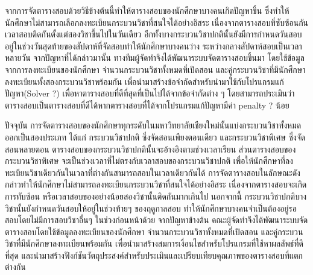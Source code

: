 \maketitle
\makesignature

\ifproject
\begin{abstractTH}
จากการจัดตารางสอบด้วยวิธีข้างต้นนี้ทำให้ตารางสอบของนักศึกษาบางคนเกิดปัญหาขึ้น
ซึ่งทำให้นักศึกษาไม่สามารถเลือกลงทะเบียนกระบวนวิชาที่สนใจได้อย่างอิสระ เนื่องจากตารางสอบที่ซับซ้อนกัน
เวลาสอบติดกันตั้งแต่สองวิชาขึ้นไปในวันเดียว อีกทั้งบางกระบวนวิชาปกตินั้นยังมีการกำหนดวันสอบอยู่ในช่วงวันสุดท้ายของสัปดาห์ที่จัดสอบทำให้นักศึกษาบางคนว่าง
ระหว่างกลางสัปดาห์สอบเป็นเวลาหลายวัน จากปัญหาที่ได้กล่าวมานั้น ทางทีมผู้จัดทำจึงได้พัฒนาระบบจัดตารางสอบขึ้นมา 
โดยใช้ข้อมูลจากการลงทะเบียนของนักศึกษา จำนวนกระบวนวิชาทั้งหมดที่เปิดสอน และคู่กระบวนวิชาที่มีนักศึกษาลงทะเบียนทั้งสองกระบวนวิชาพร้อมกัน 
เพื่อนำมาสร้างข้อจำกัดสำหรับนำมาใช้กับโปรแกรมแก้ปัญหา(Solver ?) เพื่อหาตารางสอบที่ดีที่สุดที่เป็นไปได้จากข้อจำกัดต่าง ๆ 
โดยสามารถประเมินว่าตารางสอบเป็นตารางสอบที่ดีได้หากตารางสอบที่ได้จากโปรแกรมแก้ปัญหามีค่า penalty ? น้อย 

\textcolor{Orange2}{
ปัจจุบัน การจัดตารางสอบของนักศึกษาทุกระดับในมหาวิทยาลัยเชียงใหม่นั้นแบ่งกระบวนวิชาทั้งหมดออกเป็นสองประเภท ได้แก่ กระบวนวิชาปกติ ซึ่งจัดสอนเพียงตอนเดียว และกระบวนวิชาพิเศษ ซึ่งจัดสอนหลายตอน
ตารางสอบของกระบวนวิชาปกตินั้นจะอ้างอิงตามช่วงเวลาเรียน
ส่วนตารางสอบของกระบวนวิชาพิเศษ จะเป็นช่วงเวลาที่ไม่ตรงกับเวลาสอบของกระบวนวิชาปกติ เพื่อให้นักศึกษาที่ลงทะเบียนวิชาเดียวกันในเวลาที่ต่างกันสามารถสอบในเวลาเดียวกันได้
\enskip
การจัดตารางสอบในลักษณะดังกล่าวทำให้นักศึกษาไม่สามารถลงทะเบียนกระบวนวิชาที่สนใจได้อย่างอิสระ เนื่องจากตารางสอบจะเกิดการทับซ้อน หรือเวลาสอบของอย่างน้อยสองวิชานั้นติดกันมากเกินไป
นอกจากนี้ กระบวนวิชาปกติบางวิชานั้นยังกำหนดวันสอบให้อยู่ในช่วงท้ายๆ ของฤดูกาลสอบ ทำให้นักศึกษาบางคนจำเป็นต้องอยู่รอสอบโดยไม่มีการสอบวิชาอื่นๆ ในช่วงก่อนหน้าด้วย
\enskip
จากปัญหาข้างต้น คณะผู้จัดทำจึงได้พัฒนาระบบจัดตารางสอบโดยใช้ข้อมูลลงทะเบียนของนักศึกษา จำนวนกระบวนวิชาทั้งหมดที่เปิดสอน และคู่กระบวนวิชาที่มีนักศึกษาลงทะเบียนพร้อมกัน
เพื่อนำมาสร้างสมการเงื่อนไขสำหรับโปรแกรมที่ใช้หาผลลัพธ์ที่ดีที่สุด และนำมาสร้างฟังก์ชันวัตถุประสงค์สำหรับประเมินและเปรียบเทียบคุณภาพของตารางสอบที่แตกต่างกัน
}
\end{abstractTH}

